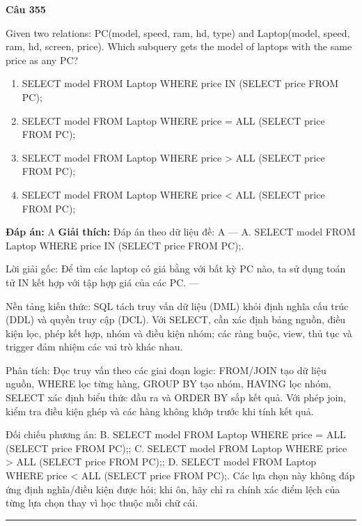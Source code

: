\documentclass[11pt,a4paper]{article}
\newenvironment{question}[1]{%
  \par\vspace{1em}\noindent\textbf{\large Câu #1}\par\vspace{0.4em}
}{%
  \par\vspace{1em}\hrule\vspace{0.6em}
}
\newenvironment{choices}{%
  \begin{enumerate}[label=\textbf{\Alph*.},leftmargin=2.2em,itemsep=2pt,topsep=3pt]
}{%
  \end{enumerate}
}
\newcommand{\choice}{\item}
\begin{document}
\begin{question}{355}
Given two relations: PC(model, speed, ram, hd, type) and Laptop(model, speed, ram, hd, screen, price). Which subquery gets the model of laptops with the same price as any PC?
\begin{choices}
\choice SELECT model FROM Laptop WHERE price IN (SELECT price FROM PC);
\choice SELECT model FROM Laptop WHERE price = ALL (SELECT price FROM PC);
\choice SELECT model FROM Laptop WHERE price > ALL (SELECT price FROM PC);
\choice SELECT model FROM Laptop WHERE price < ALL (SELECT price FROM PC);
\end{choices}
\textbf{Đáp án:} A
\textbf{Giải thích:} Đáp án theo dữ liệu đề: A — A. SELECT model FROM Laptop WHERE price IN (SELECT price FROM PC);.

Lời giải gốc: Để tìm các laptop có giá bằng với bất kỳ PC nào, ta sử dụng toán tử IN kết hợp với tập hợp giá của các PC. ---

Nền tảng kiến thức: SQL tách truy vấn dữ liệu (DML) khỏi định nghĩa cấu trúc (DDL) và quyền truy cập (DCL). Với SELECT, cần xác định bảng nguồn, điều kiện lọc, phép kết hợp, nhóm và điều kiện nhóm; các ràng buộc, view, thủ tục và trigger đảm nhiệm các vai trò khác nhau.

Phân tích: Đọc truy vấn theo các giai đoạn logic: FROM/JOIN tạo dữ liệu nguồn, WHERE lọc từng hàng, GROUP BY tạo nhóm, HAVING lọc nhóm, SELECT xác định biểu thức đầu ra và ORDER BY sắp kết quả. Với phép join, kiểm tra điều kiện ghép và các hàng không khớp trước khi tính kết quả.

Đối chiếu phương án: B. SELECT model FROM Laptop WHERE price = ALL (SELECT price FROM PC);; C. SELECT model FROM Laptop WHERE price > ALL (SELECT price FROM PC);; D. SELECT model FROM Laptop WHERE price < ALL (SELECT price FROM PC);. Các lựa chọn này không đáp ứng định nghĩa/điều kiện được hỏi; khi ôn, hãy chỉ ra chính xác điểm lệch của từng lựa chọn thay vì học thuộc mỗi chữ cái.
\end{question}
\end{document}
